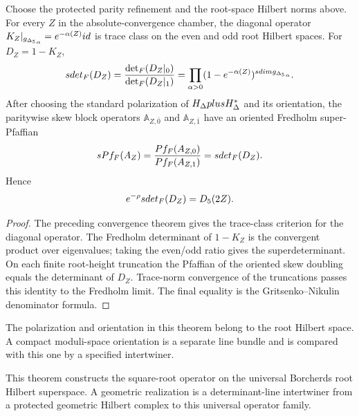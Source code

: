 \begin{theorem}
Choose the protected parity refinement and the root-space Hilbert norms above.  For every $Z$ in the absolute-convergence chamber, the diagonal operator $K_Z|_{{g_{\Delta_5}}_\alpha}=e^{-\alpha(Z)}id$ is trace class on the even and odd root Hilbert spaces.  For $D_Z=1-K_Z$,
\[
 sdet_F(D_Z)
 =\frac{\det_F(D_Z|_{0})}{\det_F(D_Z|_{1})}
 =\prod_{\alpha>0}(1-e^{-\alpha(Z)})^{sdim{g_{\Delta_5}}_\alpha}.
\]
After choosing the standard polarization of $H_\Delta plusH_\Delta^*$ and its orientation, the paritywise skew block operators $\mathbb A_{Z,\bar0}$ and $\mathbb A_{Z,\bar1}$ have an oriented Fredholm super-Pfaffian
\[
 sPf_F(A_Z)=\frac{Pf_F(A_{Z,0})}{Pf_F(A_{Z,1})}
 =sdet_F(D_Z).
\]  Hence
\[
 e^{-\rho}sdet_F(D_Z)={D_5}(2Z).
\]
\end{theorem}
\begin{proof}
The preceding convergence theorem gives the trace-class criterion for the diagonal operator.  The Fredholm determinant of $1-K_Z$ is the convergent product over eigenvalues; taking the even/odd ratio gives the superdeterminant.  On each finite root-height truncation the Pfaffian of the oriented skew doubling equals the determinant of $D_Z$.  Trace-norm convergence of the truncations passes this identity to the Fredholm limit.  The final equality is the Gritsenko--Nikulin denominator formula.
\end{proof}

\begin{remark}
The polarization and orientation in this theorem belong to the root Hilbert space.  A compact moduli-space orientation is a separate line bundle and is compared with this one by a specified intertwiner.
\end{remark}

This theorem constructs the square-root operator on the universal Borcherds root Hilbert superspace.  A geometric realization is a determinant-line intertwiner from a protected geometric Hilbert complex to this universal operator family.

